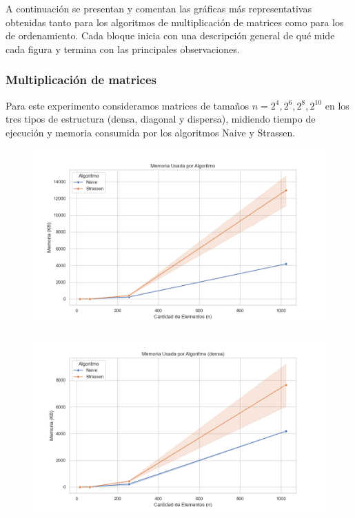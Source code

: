 A continuación se presentan y comentan las gráficas más representativas obtenidas tanto para los algoritmos de multiplicación de matrices como para los de ordenamiento. Cada bloque inicia con una descripción general de qué mide cada figura y termina con las principales observaciones.

\subsubsection{Multiplicación de matrices}

Para este experimento consideramos matrices de tamaños \(n = 2^4,2^6,2^8,2^{10}\) en los tres tipos de estructura (densa, diagonal y dispersa), midiendo tiempo de ejecución y memoria consumida por los algoritmos Naive y Strassen.

\begin{figure}[H]
    \centering
    \begin{minipage}[t]{1\textwidth}
        \includegraphics[width=\textwidth]{../code/matrix_multiplication/data/plots/memoria_vs_algoritmo.png}
     \end{minipage}%
    \caption{}
    \label{fig:scatterplot_3}
\end{figure}

\begin{figure}[H]
    \centering
    \begin{minipage}[t]{1\textwidth}
        \includegraphics[width=\textwidth]{../code/matrix_multiplication/data/plots/memoria_vs_algoritmo_densa.png}
     \end{minipage}%
    \caption{}
    \label{fig:scatterplot_3}
\end{figure}

